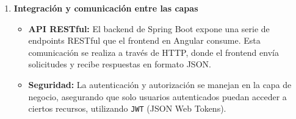 \documentclass{article} %
\begin{document}
\begin{enumerate}[font=\bfseries]
        \item \textbf{Integración y comunicación entre las capas}
        \begin{itemize}
            \item \textbf{API RESTful:} El backend de Spring Boot expone una serie de endpoints RESTful que el frontend en Angular consume. Esta comunicación se realiza a través de HTTP, donde el frontend envía solicitudes y recibe respuestas en formato JSON.
            \item \textbf{Seguridad:} La autenticación y autorización se manejan en la capa de negocio, asegurando que solo usuarios autenticados puedan acceder a ciertos recursos, utilizando \texttt{JWT} (JSON Web Tokens).
        \end{itemize}
    \end{enumerate}
    
\end{document}

